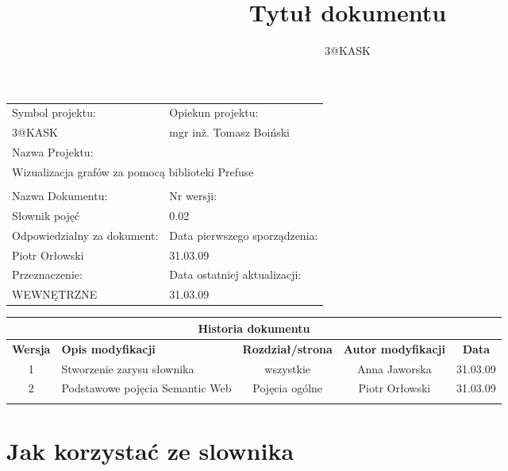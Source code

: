 \documentclass[a4paper,10pt]{article}
\title{Tytuł dokumentu}
\author{3@KASK}
\begin{document}



\maketitle


\begin{center}
\begin{tabular}{|p{7cm}|p{7cm}|}
\hline
Symbol projektu: & Opiekun projektu:   \tabularnewline 
3@KASK & mgr inż. Tomasz Boiński    \tabularnewline \hline
\multicolumn{2}{|l|}{Nazwa Projektu: } \tabularnewline
\multicolumn{2}{|l|}{Wizualizacja grafów za pomocą biblioteki Prefuse } \tabularnewline 
\hline
\multicolumn{2}{l}{ } \tabularnewline %
\hline 
Nazwa Dokumentu: & Nr wersji:   \tabularnewline 
Słownik pojęć & 0.02 \tabularnewline \hline
Odpowiedzialny za dokument: & Data pierwszego sporządzenia:   \tabularnewline 
Piotr Orłowski & 31.03.09 \tabularnewline \hline
Przeznaczenie: & Data ostatniej aktualizacji:   \tabularnewline 
WEWNĘTRZNE & 31.03.09 \tabularnewline \hline
\end{tabular}
\end{center}

\begin{center}
\begin{tabular}{|c|p{4cm}|c|c|c|}
\multicolumn{5}{c}{\textbf{Historia dokumentu}} \tabularnewline \hline
\textbf{Wersja} & \textbf{Opis modyfikacji} & \textbf{Rozdział/strona} & \textbf{Autor modyfikacji} & \textbf{Data} \tabularnewline \hline 
1 & Stworzenie zarysu słownika & wszystkie & Anna Jaworska & 31.03.09 \tabularnewline \hline
2 & Podstawowe pojęcia Semantic Web & Pojęcia ogólne & Piotr Orłowski & 31.03.09 \tabularnewline \hline
& & & &\tabularnewline \hline
\end{tabular}
\end{center}

\newpage
\tableofcontents
\newpage

\section{Jak korzystać ze slownika}
\end{document}
